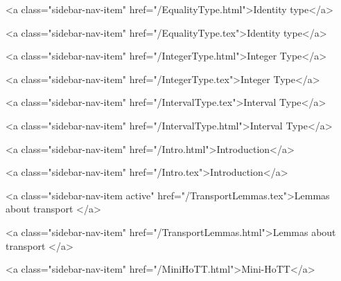       
        
          <a class="sidebar-nav-item" href="/EqualityType.html">Identity type</a>
        
      
    
      
        
          <a class="sidebar-nav-item" href="/EqualityType.tex">Identity type</a>
        
      
    
      
        
          <a class="sidebar-nav-item" href="/IntegerType.html">Integer Type</a>
        
      
    
      
        
          <a class="sidebar-nav-item" href="/IntegerType.tex">Integer Type</a>
        
      
    
      
        
          <a class="sidebar-nav-item" href="/IntervalType.tex">Interval Type</a>
        
      
    
      
        
          <a class="sidebar-nav-item" href="/IntervalType.html">Interval Type</a>
        
      
    
      
        
          <a class="sidebar-nav-item" href="/Intro.html">Introduction</a>
        
      
    
      
        
          <a class="sidebar-nav-item" href="/Intro.tex">Introduction</a>
        
      
    
      
        
          <a class="sidebar-nav-item active" href="/TransportLemmas.tex">Lemmas about transport </a>
        
      
    
      
        
          <a class="sidebar-nav-item" href="/TransportLemmas.html">Lemmas about transport </a>
        
      
    
      
        
          <a class="sidebar-nav-item" href="/MiniHoTT.html">Mini-HoTT</a>
        
      
    

